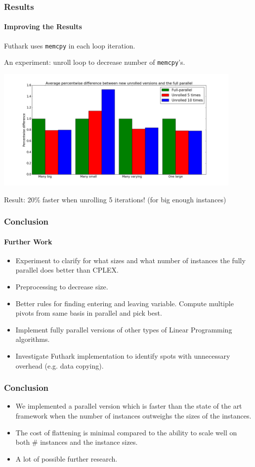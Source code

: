 \documentclass{beamer}
\newcommand{\empr}[1]{\textcolor{CosRed}{ #1}}
\begin{document}
\begin{frame}[fragile]
\frametitle{Results}
\framesubtitle{Improving the Results}
\centering
Futhark uses \texttt{memcpy} in each loop iteration.

An experiment: unroll loop to decrease number of \texttt{memcpy}'s.

\pause

\includegraphics[width=0.9\textwidth]{../Doc/figures/unrolling}

 \empr{Result: 20\% faster when unrolling 5 iterations! {\tiny(for big enough instances)}}

\end{frame}



\begin{frame}
\frametitle{Conclusion}
\framesubtitle{Further Work}
\begin{itemize}
	\item Experiment to clarify for what sizes and what number of instances the fully parallel does better than CPLEX.
	\item Preprocessing to decrease size.
	\item Better rules for finding entering and leaving variable. Compute multiple pivots from same basis in parallel and pick best.
	\item Implement fully parallel versions of other types of Linear Programming algorithms.
	\item Investigate Futhark implementation to identify spots with unnecessary overhead (e.g. data copying).
\end{itemize}
\end{frame}

\begin{frame}
\frametitle{Conclusion}
\begin{itemize}
	\item We implemented a parallel version which is faster than the state of the art framework when the number of instances outweighs the sizes of the instances.
	\item The cost of flattening is minimal compared to the ability to scale well on both \# instances and the instance sizes.
	\item A lot of possible further research.
\end{itemize}
\end{frame}
\end{document}
